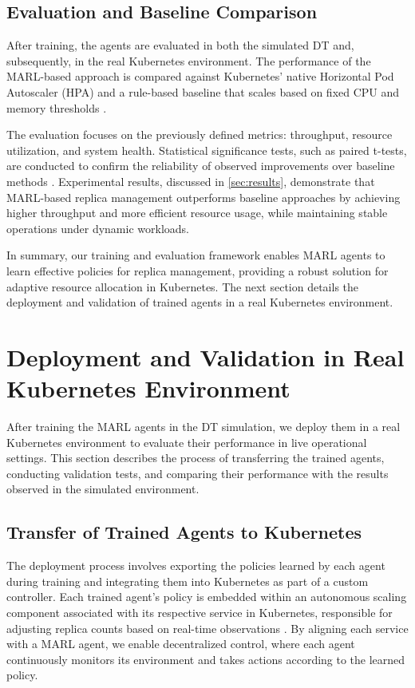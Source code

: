 \documentclass[conference]{IEEEtran}
\begin{document}
\subsection{Evaluation and Baseline Comparison}

After training, the agents are evaluated in both the simulated DT and, subsequently, in the real Kubernetes environment. The performance of the MARL-based approach is compared against Kubernetes' native Horizontal Pod Autoscaler (HPA) and a rule-based baseline that scales based on fixed CPU and memory thresholds \cite{rosenberg_k8s_autoscaling}.

The evaluation focuses on the previously defined metrics: throughput, resource utilization, and system health. Statistical significance tests, such as paired t-tests, are conducted to confirm the reliability of observed improvements over baseline methods \cite{zhang_marl_k8s}. Experimental results, discussed in \autoref{sec:results}, demonstrate that MARL-based replica management outperforms baseline approaches by achieving higher throughput and more efficient resource usage, while maintaining stable operations under dynamic workloads.

In summary, our training and evaluation framework enables MARL agents to learn effective policies for replica management, providing a robust solution for adaptive resource allocation in Kubernetes. The next section details the deployment and validation of trained agents in a real Kubernetes environment.


\section{Deployment and Validation in Real Kubernetes Environment}
\label{sec:deployment_validation}

After training the MARL agents in the DT simulation, we deploy them in a real Kubernetes environment to evaluate their performance in live operational settings. This section describes the process of transferring the trained agents, conducting validation tests, and comparing their performance with the results observed in the simulated environment.

\subsection{Transfer of Trained Agents to Kubernetes}

The deployment process involves exporting the policies learned by each agent during training and integrating them into Kubernetes as part of a custom controller. Each trained agent’s policy is embedded within an autonomous scaling component associated with its respective service in Kubernetes, responsible for adjusting replica counts based on real-time observations \cite{nguyen_sim2reality}. By aligning each service with a MARL agent, we enable decentralized control, where each agent continuously monitors its environment and takes actions according to the learned policy.
\end{document}
